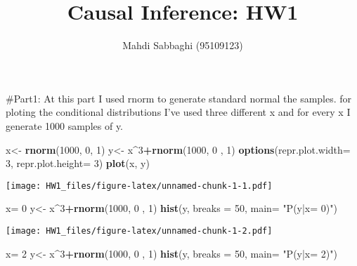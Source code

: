 \documentclass[]{article}
\title{Causal Inference: HW1}
\author{Mahdi Sabbaghi (95109123)}
\date{}
\newenvironment{Shaded}{\begin{snugshade}}{\end{snugshade}}
\newcommand{\DataTypeTok}[1]{\textcolor[rgb]{0.13,0.29,0.53}{#1}}
\newcommand{\DecValTok}[1]{\textcolor[rgb]{0.00,0.00,0.81}{#1}}
\newcommand{\KeywordTok}[1]{\textcolor[rgb]{0.13,0.29,0.53}{\textbf{#1}}}
\newcommand{\NormalTok}[1]{#1}
\newcommand{\OperatorTok}[1]{\textcolor[rgb]{0.81,0.36,0.00}{\textbf{#1}}}
\newcommand{\StringTok}[1]{\textcolor[rgb]{0.31,0.60,0.02}{#1}}
\begin{document}
\maketitle

\#Part1: At this part I used rnorm to generate standard normal the
samples. for ploting the conditional distributions I've used three
different x and for every x I generate 1000 samples of y.

\begin{Shaded}
\begin{Highlighting}[]
\NormalTok{x<-}\StringTok{ }\KeywordTok{rnorm}\NormalTok{(}\DecValTok{1000}\NormalTok{, }\DecValTok{0}\NormalTok{, }\DecValTok{1}\NormalTok{)}
\NormalTok{y<-}\StringTok{ }\NormalTok{x}\OperatorTok{^}\DecValTok{3}\OperatorTok{+}\KeywordTok{rnorm}\NormalTok{(}\DecValTok{1000}\NormalTok{, }\DecValTok{0}\NormalTok{ , }\DecValTok{1}\NormalTok{)}
\KeywordTok{options}\NormalTok{(}\DataTypeTok{repr.plot.width=} \DecValTok{3}\NormalTok{, }\DataTypeTok{repr.plot.height=} \DecValTok{3}\NormalTok{)}
\KeywordTok{plot}\NormalTok{(x, y)}
\end{Highlighting}
\end{Shaded}

\texttt{[image: HW1\_files/figure-latex/unnamed-chunk-1-1.pdf]}

\begin{Shaded}
\begin{Highlighting}[]
\NormalTok{x=}\StringTok{ }\DecValTok{0}
\NormalTok{y<-}\StringTok{ }\NormalTok{x}\OperatorTok{^}\DecValTok{3}\OperatorTok{+}\KeywordTok{rnorm}\NormalTok{(}\DecValTok{1000}\NormalTok{, }\DecValTok{0}\NormalTok{ , }\DecValTok{1}\NormalTok{)}
\KeywordTok{hist}\NormalTok{(y, }\DataTypeTok{breaks =}  \DecValTok{50}\NormalTok{, }\DataTypeTok{main=} \StringTok{"P(y|x= 0)"}\NormalTok{)}
\end{Highlighting}
\end{Shaded}

\texttt{[image: HW1\_files/figure-latex/unnamed-chunk-1-2.pdf]}

\begin{Shaded}
\begin{Highlighting}[]
\NormalTok{x=}\StringTok{ }\DecValTok{2}
\NormalTok{y<-}\StringTok{ }\NormalTok{x}\OperatorTok{^}\DecValTok{3}\OperatorTok{+}\KeywordTok{rnorm}\NormalTok{(}\DecValTok{1000}\NormalTok{, }\DecValTok{0}\NormalTok{ , }\DecValTok{1}\NormalTok{)}
\KeywordTok{hist}\NormalTok{(y, }\DataTypeTok{breaks =}  \DecValTok{50}\NormalTok{, }\DataTypeTok{main=} \StringTok{"P(y|x= 2)"}\NormalTok{)}
\end{Highlighting}
\end{Shaded}
\end{document}
